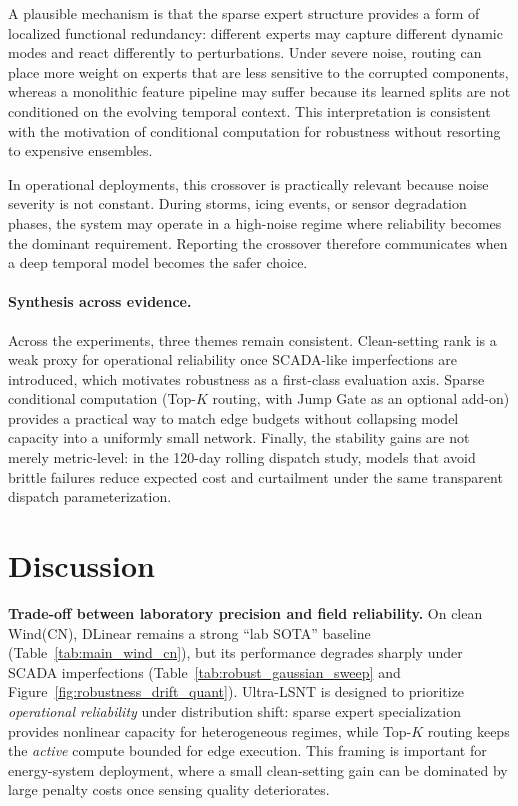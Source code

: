 \documentclass[review,3p,times]{elsarticle}
\begin{document}
A plausible mechanism is that the sparse expert structure provides a form of localized functional redundancy: different experts may capture different dynamic modes and react differently to perturbations. Under severe noise, routing can place more weight on experts that are less sensitive to the corrupted components, whereas a monolithic feature pipeline may suffer because its learned splits are not conditioned on the evolving temporal context. This interpretation is consistent with the motivation of conditional computation for robustness without resorting to expensive ensembles.

In operational deployments, this crossover is practically relevant because noise severity is not constant. During storms, icing events, or sensor degradation phases, the system may operate in a high-noise regime where reliability becomes the dominant requirement. Reporting the crossover therefore communicates when a deep temporal model becomes the safer choice.


\paragraph{Synthesis across evidence.}
Across the experiments, three themes remain consistent. Clean-setting rank is a weak proxy for operational reliability once SCADA-like imperfections are introduced, which motivates robustness as a first-class evaluation axis. Sparse conditional computation (Top-$K$ routing, with Jump Gate as an optional add-on) provides a practical way to match edge budgets without collapsing model capacity into a uniformly small network. Finally, the stability gains are not merely metric-level: in the 120-day rolling dispatch study, models that avoid brittle failures reduce expected cost and curtailment under the same transparent dispatch parameterization.



\section{Discussion}
\label{sec:discussion}

\textbf{Trade-off between laboratory precision and field reliability.}
On clean Wind(CN), DLinear remains a strong ``lab SOTA'' baseline (Table~\ref{tab:main_wind_cn}), but its performance degrades sharply under SCADA imperfections (Table~\ref{tab:robust_gaussian_sweep} and Figure~\ref{fig:robustness_drift_quant}).
Ultra-LSNT is designed to prioritize \emph{operational reliability} under distribution shift: sparse expert specialization provides nonlinear capacity for heterogeneous regimes, while Top-$K$ routing keeps the \emph{active} compute bounded for edge execution.
This framing is important for energy-system deployment, where a small clean-setting gain can be dominated by large penalty costs once sensing quality deteriorates.
\end{document}
